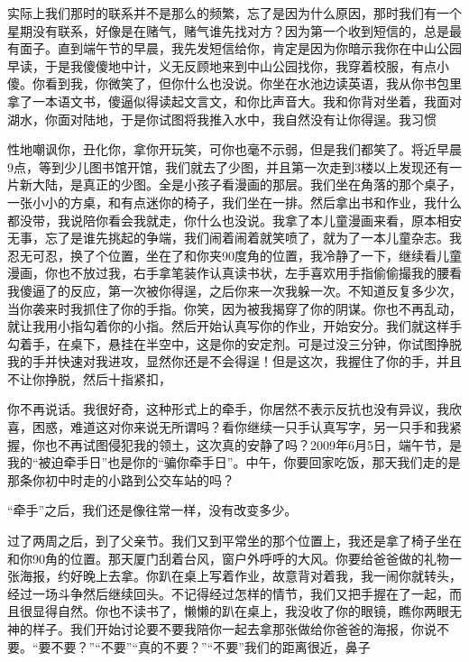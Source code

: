 \documentclass{article}
\begin{document}
实际上我们那时的联系并不是那么的频繁，忘了是因为什么原因，那时我们有一个星期没有联系，好像是在赌气，赌气谁先找对方？因为第一个收到短信的，总是最有面子。直到端午节的早晨，我先发短信给你，肯定是因为你暗示我你在中山公园早读，于是我傻傻地中计，义无反顾地来到中山公园找你，我穿着校服，有点小傻。你看到我，你微笑了，但你什么也没说。你坐在水池边读英语，我从你书包里拿了一本语文书，傻逼似得读起文言文，和你比声音大。我和你背对坐着，我面对湖水，你面对陆地，于是你试图将我推入水中，我自然没有让你得逞。我习惯

\newpage 

性地嘲讽你，丑化你，拿你开玩笑，可你也毫不示弱，但是我们都笑了。将近早晨9点，等到少儿图书馆开馆，我们就去了少图，并且第一次走到3楼以上发现还有一片新大陆，是真正的少图。全是小孩子看漫画的那层。我们坐在角落的那个桌子，一张小小的方桌，和有点迷你的椅子，我们坐在一排。然后拿出书和作业，我什么都没带，我说陪你看会我就走，你什么也没说。我拿了本儿童漫画来看，原本相安无事，忘了是谁先挑起的争端，我们闹着闹着就笑喷了，就为了一本儿童杂志。我忍无可忍，换了个位置，坐在了和你夹90度角的位置，我冷静了一下，继续看儿童漫画，你也不放过我，右手拿笔装作认真读书状，左手喜欢用手指偷偷撮我的腰看我傻逼了的反应，第一次被你得逞，之后你来一次我躲一次。不知道反复多少次，当你袭来时我抓住了你的手指。你笑，因为被我揭穿了你的阴谋。你也不再乱动，就让我用小指勾着你的小指。然后开始认真写你的作业，开始安分。我们就这样手勾着手，在桌下，悬挂在半空中，这是你的安定剂。可是过没三分钟，你试图挣脱我的手并快速对我进攻，显然你还是不会得逞！但是这次，我握住了你的手，并且不让你挣脱，然后十指紧扣，

\newpage 

你不再说话。我很好奇，这种形式上的牵手，你居然不表示反抗也没有异议，我欣喜，困惑，难道这对你来说无所谓吗？看你继续一只手认真写字，另一只手和我紧握，你也不再试图侵犯我的领土，这次真的安静了吗？2009年6月5日，端午节，是我的“被迫牵手日”也是你的“骗你牵手日”。中午，你要回家吃饭，那天我们走的是那条你初中时走的小路到公交车站的吗？

“牵手”之后，我们还是像往常一样，没有改变多少。

过了两周之后，到了父亲节。我们又到平常坐的那个位置上，我还是拿了椅子坐在和你90角的位置。那天厦门刮着台风，窗户外呼呼的大风。你要给爸爸做的礼物一张海报，约好晚上去拿。你趴在桌上写着作业，故意背对着我，我一闹你就转头，经过一场斗争然后继续回头。不记得经过怎样的情节，我们又把手握在了一起，而且很显得自然。你也不读书了，懒懒的趴在桌上，我没收了你的眼镜，瞧你两眼无神的样子。我们开始讨论要不要我陪你一起去拿那张做给你爸爸的海报，你说不要。“要不要？”“不要”“真的不要？”“不要”我们的距离很近，鼻子
\end{document}
